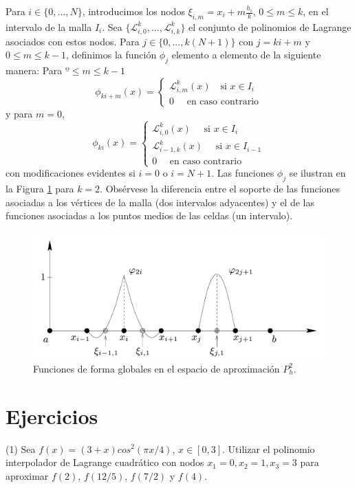 Para $i \in \{ 0,..., N \}$, introducimos los nodos $\xi_{i, m} = x_i + m \frac{h_i}{k}$, $0 \leq m \leq k$, en el intervalo de la malla $I_i$. Sea $\{ \mathcal{L}_{i, 0}^k,..., \mathcal{L}_{i, k}^k \}$ el conjunto de polinomios de Lagrange asociados con estos nodos. Para $j \in \{ 0,..., k(N + 1) \}$ con $j = ki + m$ y $0 \leq m \leq k - 1$, definimos la función $\phi_j$ elemento a elemento de la siguiente manera: Para $º \leq m \leq k - 1$
\[ \phi_{ki + m}(x) = \begin{cases}
    \mathcal{L}_{i, m}^k (x) \quad \text{si } x \in I_i \\
    0   \quad \text{ en caso contrario}
\end{cases} \]
y para $m = 0$,
\[ \phi_{ki}(x) = \begin{cases}
    \mathcal{L}_{i, 0}^k(x) \quad \text{ si } x \in I_i \\
    \mathcal{L}_{i - 1, k}^k(x) \quad \text{ si } x \in I_{i - 1} \\
    0 \quad \text{ en caso contrario }
\end{cases} \]
con modificaciones evidentes si $i = 0$ o $i = N + 1$. Las funciones $\phi_j$ se ilustran en la Figura \ref{fig: phij para k2} para $k = 2$. Obsérvese la diferencia entre el soporte de las funciones asociadas a los vértices de la malla (dos intervalos adyacentes) y el de las funciones asociadas a los puntos medios de las celdas (un intervalo).
\begin{figure}[h]
    \centering
    \includegraphics[width = 0.5 \textwidth]{Imagenes/4 - Funciones de forma globales en el espacio de aproximacion Ph2.png}
    \caption{Funciones de forma globales en el espacio de aproximación $P_h^2$.}
    \label{fig: phij para k2}
\end{figure}

\section*{Ejercicios}
\noindent (1) Sea $f(x) = (3 + x) cos^2(\pi x /4)$, $x \in [0, 3]$. Utilizar el polinomio interpolador de Lagrange cuadrático con nodos $x_1 = 0, x_2 = 1, x_3 = 3$ para aproximar $f(2)$, $f(12/5)$, $f(7/2)$ y $f(4)$.

